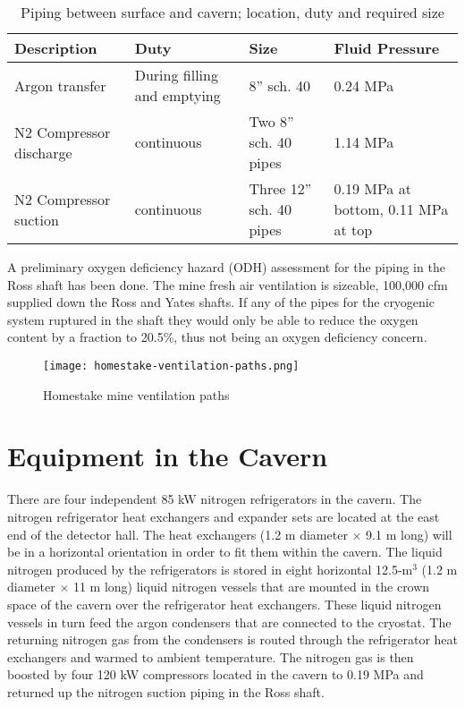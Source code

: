 \begin{table}
\caption{Piping between surface and cavern; location, duty and required size}
\label{table:pipelines}
\begin{tabular}[htbp]{|p{}|p{}|p{}|p{}|}
\hline
{\bf Description} & {\bf Duty} & {\bf Size} & {\bf Fluid Pressure} \\
\hline
Argon transfer & During filling and emptying & 8'' sch. 40 &  0.24 MPa\\
\hline
N2 Compressor discharge & continuous & Two 8'' sch. 40 pipes & 1.14 MPa \\
\hline
N2 Compressor suction & continuous & Three 12'' sch. 40 pipes &  0.19 MPa at bottom, 0.11 MPa at top \\
\hline\end{tabular} 
\end{table}

A preliminary oxygen deficiency hazard (ODH) assessment for the piping in the Ross shaft has
been done. The mine fresh air ventilation is sizeable, 100,000 cfm supplied down the Ross and
Yates shafts. If any of the pipes for the cryogenic system ruptured in the shaft they would only
be able to reduce the oxygen content by a fraction to 20.5\%, thus not being an oxygen
deficiency concern.

\begin{figure}[htbp]
\centering
\texttt{[image: homestake-ventilation-paths.png]} 
\caption{Homestake mine ventilation paths}
\label{fig:ventilation-paths}
\end{figure}


\section{Equipment in the Cavern}

There are four independent 85 kW nitrogen refrigerators in the cavern. The nitrogen
refrigerator heat exchangers and expander sets are located at the east end of the detector hall.
The heat exchangers (1.2 m diameter $\times$ 9.1 m long) will be in a horizontal orientation in order to
fit them within the cavern. The liquid nitrogen produced by the refrigerators is stored in
eight horizontal 12.5-m$^3$ (1.2 m diameter $\times$ 11 m long) liquid nitrogen vessels that are mounted in the
crown space of the cavern over the refrigerator heat exchangers. These liquid nitrogen vessels
in turn feed the argon condensers that are connected to the cryostat. The returning nitrogen
gas from the condensers is routed through the refrigerator heat exchangers and warmed to
ambient temperature. The nitrogen gas is then boosted by four 120 kW compressors located in
the cavern to 0.19 MPa and returned up the nitrogen suction piping in the Ross shaft.

